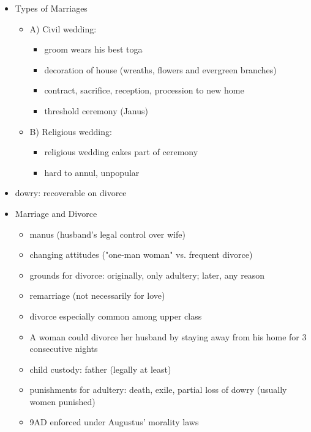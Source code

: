 \documentclass[12pt, twoside]{article}
\begin{document}
\begin{itemize}
\begin{itemize}
	\end{itemize}
\item Types of Marriages
	\begin{itemize}
	\item A) Civil wedding: 
		\begin{itemize}
		\item groom wears his best toga
		\item decoration of house (wreaths, flowers and evergreen branches)
		\item contract, sacrifice, reception, procession to new home
		\item threshold ceremony (Janus)
		\end{itemize}
	\item B) Religious wedding:
		\begin{itemize}
		\item religious wedding cakes part of ceremony
		\item hard to annul, unpopular
		\end{itemize}
	\end{itemize}
\item dowry: recoverable on divorce
\item Marriage and Divorce
	\begin{itemize}
	\item manus (husband's legal control over wife)
	\item changing attitudes ("one-man woman" vs. frequent divorce)
	\item grounds for divorce: originally, only adultery; later, any reason
	\item remarriage (not necessarily for love)
	\item divorce especially common among upper class
	\item A woman could divorce her husband by staying away from his home for 3 consecutive nights
	\item child custody: father (legally at least)
	\item punishments for adultery: death, exile, partial loss of dowry (usually women punished)
	\item 9AD enforced under Augustus’ morality laws
	\end{itemize}
\end{itemize}
\end{document}
